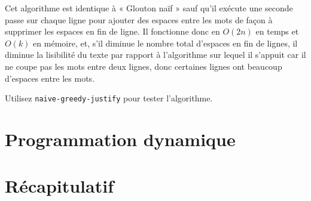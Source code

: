 \documentclass{article}
\begin{document}
Cet algorithme est identique à « Glouton naïf » sauf qu'il exécute une seconde
passe sur chaque ligne pour ajouter des espaces entre les mots de façon à
supprimer les espaces en fin de ligne. Il fonctionne donc en $O(2n)$ en temps et
$O(k)$ en mémoire, et, s'il diminue le nombre total d'espaces en fin de lignes,
il diminue la lisibilité du texte par rapport à l'algorithme sur lequel il
s'appuit car il ne coupe pas les mots entre deux lignes, donc certaines lignes
ont beaucoup d'espaces entre les mots.

Utilisez \verb|naive-greedy-justify| pour tester l’algorithme.

\section{Programmation dynamique}

\section{Récapitulatif}
\end{document}
